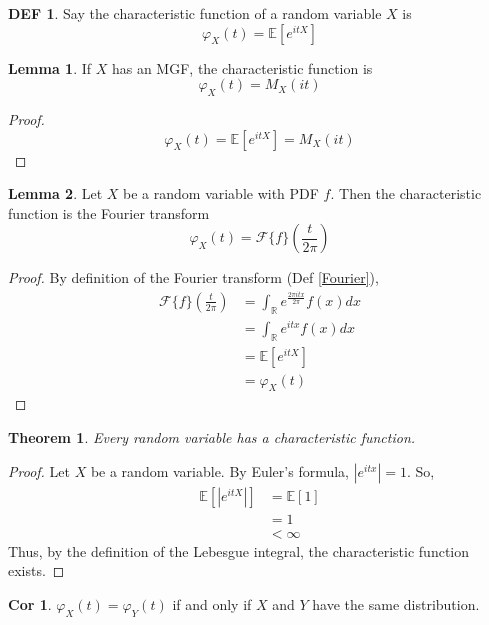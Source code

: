 \documentclass{article}
\newtheorem{theorem}{Theorem}
\theoremstyle{definition}\newtheorem{definition}{DEF}
\theoremstyle{lemma}\newtheorem{lemma}{Lemma}
\theoremstyle{corrolary}\newtheorem{corrolary}{Cor}
\begin{document}
\begin{definition}
Say the characteristic function of a random variable $X$ is
\begin{equation}
\varphi_X (t)=\mathbb{E}[e^{itX}]
\end{equation}
\end{definition}

\begin{lemma}
If $X$ has an MGF, the characteristic function is
\begin{equation}
\varphi_X (t) = M_X (it)
\end{equation}
\end{lemma}
\begin{proof}
$$\varphi_X (t) = \mathbb{E}[e^{itX}]=M_X(it)$$
\end{proof}

\begin{lemma}
Let $X$ be a random variable with PDF $f$.
Then the characteristic function is the Fourier transform
\begin{equation}
\varphi_X (t)=\mathscr{F}\{f\}\left(\frac{t}{2\pi}\right)
\end{equation}
\end{lemma}
\begin{proof}
By definition of the Fourier transform (Def \ref{Fourier}),
\begin{align*}
\mathscr{F}\{f\}\left(\frac{t}{2\pi}\right) &= \int_\mathbb{R} e^{\frac{2\pi itx}{2\pi}} f(x) dx\\
&= \int_\mathbb{R} e^{itx}f(x)dx\\
&=\mathbb{E}[e^{itX}]\\
&=\varphi_X (t)
\end{align*}
\end{proof}

\begin{theorem}
Every random variable has a characteristic function.
\end{theorem}
\begin{proof}
Let $X$ be a random variable.
By Euler's formula, $|e^{itx}|=1$.
So,
\begin{align*}
\mathbb{E}[|e^{itX}|] &= \mathbb{E}[1]\\
&= 1\\
&<\infty
\end{align*}
Thus, by the definition of the Lebesgue integral, the characteristic function exists.
\end{proof}
\begin{corrolary}
$\varphi_X (t)=\varphi_Y (t)$ if and only if $X$ and $Y$ have the same distribution.
\end{corrolary}
\end{document}
